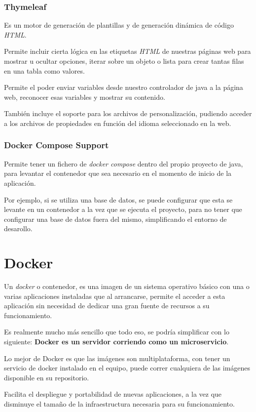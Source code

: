 \subsubsection{Thymeleaf}

Es un motor de generación de plantillas y de generación dinámica de código \textit{HTML}.

Permite incluir cierta lógica en las etiquetas \textit{HTML} de nuestras páginas web para mostrar u ocultar opciones, iterar sobre un objeto o lista para crear tantas filas en una tabla como valores.

Permite el poder enviar variables desde nuestro controlador de java a la página web, reconocer esas variables y mostrar su contenido.

También incluye el soporte para los archivos de personalización, pudiendo acceder a los archivos de propiedades en función del idioma seleccionado en la web.

\subsubsection{Docker Compose Support}

Permite tener un fichero de \textit{docker compose} dentro del propio proyecto de java, para levantar el contenedor que sea necesario en el momento de inicio de la aplicación.

Por ejemplo, si se utiliza una base de datos, se puede configurar que esta se levante en un contenedor a la vez que se ejecuta el proyecto, para no tener que configurar una base de datos fuera del mismo, simplificando el entorno de desarollo.

\section{Docker}

Un \textit{docker} o contenedor, es una imagen de un sistema operativo básico con una o varias aplicaciones instaladas que al arrancarse, permite el acceder a esta aplicación sin necesidad de dedicar una gran fuente de recursos a su funcionamiento.

Es realmente mucho más sencillo que todo eso, se podría simplificar con lo siguiente: \textbf{Docker es un servidor corriendo como un microservicio}.

Lo mejor de Docker es que las imágenes son multiplataforma, con tener un servicio de docker instalado en el equipo, puede correr cualquiera de las imágenes disponible en su repositorio.

Facilita el despliegue y portabilidad de nuevas aplicaciones, a la vez que disminuye el tamaño de la infraestructura necesaria para su funcionamiento.



